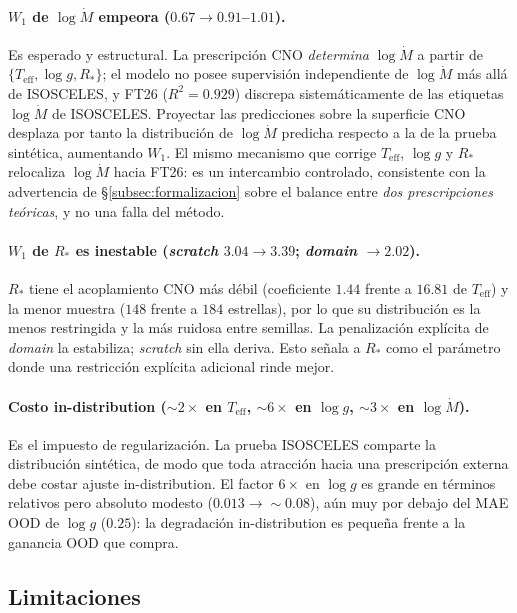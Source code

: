 \documentclass[sigconf,ACM]{acmart}
\begin{document}
\paragraph{$W_1$ de $\log\dot{M}$ empeora ($0.67\to0.91$--$1.01$).} Es esperado y
estructural. La prescripción CNO \emph{determina} $\log\dot{M}$ a partir de
$\{T_\mathrm{eff}, \log g, R_*\}$; el modelo no posee supervisión independiente de
$\log\dot{M}$ más allá de ISOSCELES, y FT26 ($R^2=0.929$) discrepa
sistemáticamente de las etiquetas $\log\dot{M}$ de ISOSCELES. Proyectar las
predicciones sobre la superficie CNO desplaza por tanto la distribución de
$\log\dot{M}$ predicha respecto a la de la prueba sintética, aumentando $W_1$. El
mismo mecanismo que corrige $T_\mathrm{eff}$, $\log g$ y $R_*$ relocaliza
$\log\dot{M}$ hacia FT26: es un intercambio controlado, consistente con la
advertencia de §\ref{subsec:formalizacion} sobre el balance entre \emph{dos
prescripciones teóricas}, y no una falla del método.

\paragraph{$W_1$ de $R_*$ es inestable (\emph{scratch} $3.04\to3.39$; \emph{domain}
$\to2.02$).} $R_*$ tiene el acoplamiento CNO más débil (coeficiente $1.44$ frente a
$16.81$ de $T_\mathrm{eff}$) y la menor muestra ($148$ frente a $184$ estrellas),
por lo que su distribución es la menos restringida y la más ruidosa entre semillas.
La penalización explícita de \emph{domain} la estabiliza; \emph{scratch} sin ella
deriva. Esto señala a $R_*$ como el parámetro donde una restricción explícita
adicional rinde mejor.

\paragraph{Costo in-distribution (${\sim}2\times$ en $T_\mathrm{eff}$, ${\sim}6\times$
en $\log g$, ${\sim}3\times$ en $\log\dot{M}$).} Es el impuesto de regularización.
La prueba ISOSCELES comparte la distribución sintética, de modo que toda atracción
hacia una prescripción externa debe costar ajuste in-distribution. El factor
$6\times$ en $\log g$ es grande en términos relativos pero absoluto modesto
($0.013\to{\sim}0.08$), aún muy por debajo del MAE OOD de $\log g$ ($0.25$): la
degradación in-distribution es pequeña frente a la ganancia OOD que compra.

\subsection{Limitaciones}
\end{document}
